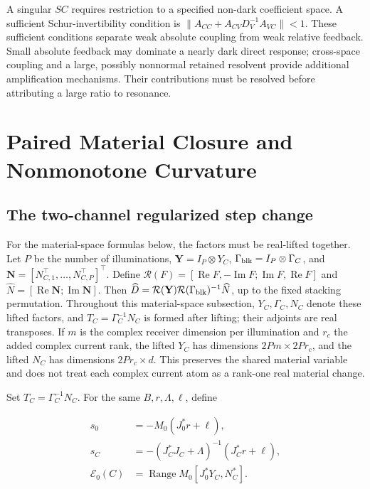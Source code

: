 A singular \(SC\) requires restriction to a specified non-dark coefficient space. A sufficient Schur-invertibility condition is \(\|A_{CC}+A_{CV}D_V^{-1}A_{VC}\|<1\). These sufficient conditions separate weak absolute coupling from weak relative feedback. Small absolute feedback may dominate a nearly dark direct response; cross-space coupling and a large, possibly nonnormal retained resolvent provide additional amplification mechanisms. Their contributions must be resolved before attributing a large ratio to resonance.

\section{Paired Material Closure and Nonmonotone Curvature}

\subsection{The two-channel regularized step change}

For the material-space formulas below, the factors must be real-lifted together. Let $P$ be the number of illuminations, $\mathbf Y=I_P\otimes Y_C$, $\Gamma_{\rm blk}=I_P\otimes\Gamma_C$, and $\mathbf N=[N_{C,1}^\top,\ldots,N_{C,P}^\top]^\top$. Define $\mathcal R(F)=[\operatorname{Re}F,-\operatorname{Im}F;\operatorname{Im}F,\operatorname{Re}F]$ and $\widehat N=[\operatorname{Re}\mathbf N;\operatorname{Im}\mathbf N]$. Then $\widehat D=\mathcal R(\mathbf Y)\mathcal R(\Gamma_{\rm blk})^{-1}\widehat N$, up to the fixed stacking permutation. Throughout this material-space subsection, $Y_C,\Gamma_C,N_C$ denote these lifted factors, and $T_C=\Gamma_C^{-1}N_C$ is formed after lifting; their adjoints are real transposes. If $m$ is the complex receiver dimension per illumination and $r_c$ the added complex current rank, the lifted $Y_C$ has dimensions $2Pm\times2Pr_c$, and the lifted $N_C$ has dimensions $2Pr_c\times d$. This preserves the shared material variable and does not treat each complex current atom as a rank-one real material change.

Set \(T_C=\Gamma_C^{-1}N_C\). For the same \(B,r,\Lambda,\ell\), define

\[
\begin{aligned}
s_0&=-M_0(J_0^*r+\ell),\\
s_C&=-(J_C^*J_C+\Lambda)^{-1}(J_C^*r+\ell),\\
\mathcal E_0(C)&=\operatorname{Range}M_0[J_0^*Y_C,N_C^*].
\end{aligned}\tag{10}
\]

